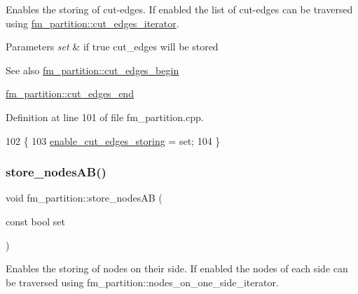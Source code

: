 Enables the storing of cut-\/edges. If enabled the list of cut-\/edges can be traversed using \mbox{\hyperlink{classfm__partition_a15e854cf1efcae91d05a48f2a9fd0761}{fm\+\_\+partition\+::cut\+\_\+edges\+\_\+iterator}}.


\begin{DoxyParams}{Parameters}
{\em set} & if {\ttfamily true} cut\+\_\+edges will be stored \\
\hline
\end{DoxyParams}
\begin{DoxySeeAlso}{See also}
\mbox{\hyperlink{classfm__partition_a36990b62c6d2d9e4948f42d805afc626}{fm\+\_\+partition\+::cut\+\_\+edges\+\_\+begin}} 

\mbox{\hyperlink{classfm__partition_af213672f08e03878183659fa8c2ed61e}{fm\+\_\+partition\+::cut\+\_\+edges\+\_\+end}} 
\end{DoxySeeAlso}


Definition at line 101 of file fm\+\_\+partition.\+cpp.


\begin{DoxyCode}
102 \{
103     \mbox{\hyperlink{classfm__partition_a806c9f5cb781b8ce662d2a3373433777}{enable\_cut\_edges\_storing}} = \textcolor{keyword}{set};
104 \}
\end{DoxyCode}
\mbox{\label{classfm__partition_a8926005b4637055d2acf6f29ad2d9b97}} 
\subsubsection{\texorpdfstring{store\+\_\+nodes\+A\+B()}{store\_nodesAB()}}
{\footnotesize\ttfamily void fm\+\_\+partition\+::store\+\_\+nodes\+AB (\begin{DoxyParamCaption}\item[{const bool}]{set }\end{DoxyParamCaption})}

Enables the storing of nodes on their side. If enabled the nodes of each side can be traversed using fm\+\_\+partition\+::nodes\+\_\+on\+\_\+one\+\_\+side\+\_\+iterator.


